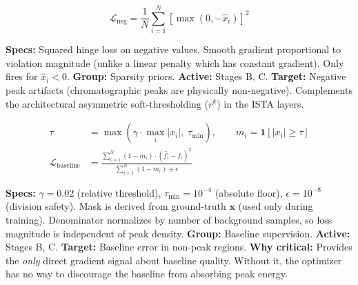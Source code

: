 \documentclass[11pt, letterpaper]{article}
\begin{document}
\vspace{0.3em}

\begin{questionbox}
\normalfont
$$
\mathcal{L}_{\text{neg}} = \frac{1}{N} \sum_{i=1}^{N} \left[\max(0, -\hat{x}_i)\right]^2
$$
\end{questionbox}
\begin{answerbox}
\textbf{Specs:} Squared hinge loss on negative values.  Smooth gradient proportional to violation magnitude
(unlike a linear penalty which has constant gradient).  Only fires for $\hat{x}_i < 0$.
\textbf{Group:} Sparsity priors.  \textbf{Active:} Stages B, C.
\textbf{Target:} Negative peak artifacts (chromatographic peaks are physically non-negative).
Complements the architectural asymmetric soft-thresholding ($r^k$) in the ISTA layers.
\end{answerbox}

\vspace{0.3em}

\begin{questionbox}
\normalfont
\begin{align*}
\tau &= \max\!\left(\gamma \cdot \max_i |x_i|,\; \tau_{\min}\right), \qquad
m_i = \mathbf{1}\!\left[|x_i| \geq \tau\right] \\
\mathcal{L}_{\text{baseline}} &= \frac{\sum_{i=1}^{N}(1 - m_i) \cdot (\hat{f}_i - f_i)^2}{\sum_{i=1}^{N}(1 - m_i) + \epsilon}
\end{align*}
\end{questionbox}
\begin{answerbox}
\textbf{Specs:} $\gamma = 0.02$ (relative threshold), $\tau_{\min} = 10^{-4}$ (absolute floor),
$\epsilon = 10^{-8}$ (division safety).  Mask is derived from ground-truth $\mathbf{x}$ (used only during
training).  Denominator normalizes by number of background samples, so loss magnitude is independent of
peak density.
\textbf{Group:} Baseline supervision.  \textbf{Active:} Stages B, C.
\textbf{Target:} Baseline error in non-peak regions.
\textbf{Why critical:} Provides the \emph{only} direct gradient signal about baseline quality.  Without it, the
optimizer has no way to discourage the baseline from absorbing peak energy.
\end{answerbox}

\vspace{0.3em}
\end{document}
